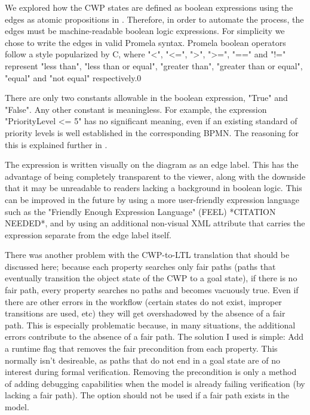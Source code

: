 We explored how the CWP states are defined as boolean expressions using the edges as atomic propositions in . Therefore, in order to automate the process, the edges must be machine-readable boolean logic expressions. For simplicity we chose to write the edges in valid Promela syntax. Promela boolean operators follow a style popularized by C, where "<", "<=", ">", ">=", "==" and "!=" represent "less than", "less than or equal", "greater than", "greater than or equal", "equal" and "not equal" respectively.0

There are only two constants allowable in the boolean expression, "True" and "False". Any other constant is meaningless. For example, the expression "PriorityLevel <= 5" has no significant meaning, even if an existing standard of priority levels is well established in the corresponding BPMN. The reasoning for this is explained further in .

The expression is written visually on the diagram as an edge label. This has the advantage of being completely transparent to the viewer, along with the downside that it may be unreadable to readers lacking a background in boolean logic. This can be improved in the future by using a more user-friendly expression language such as the "Friendly Enough Expression Language" (FEEL) *CITATION NEEDED*, and by using an additional non-visual XML attribute that carries the expression separate from the edge label itself.

There was another problem with the CWP-to-LTL translation that should be discussed here; because each property searches only fair paths (paths that eventually transition the object state of the CWP to a goal state), if there is no fair path, every property searches no paths and becomes vacuously true. Even if there are other errors in the workflow (certain states do not exist, improper transitions are used, etc) they will get overshadowed by the absence of a fair path. This is especially problematic because, in many situations, the additional errors contribute to the absence of a fair path. The solution I used is simple: Add a runtime flag that removes the fair precondition from each property. This normally isn't desireable, as paths that do not end in a goal state are of no interest during formal verification. Removing the precondition is only a method of adding debugging capabilities when the model is already failing verification (by lacking a fair path). The option should not be used if a fair path exists in the model.

